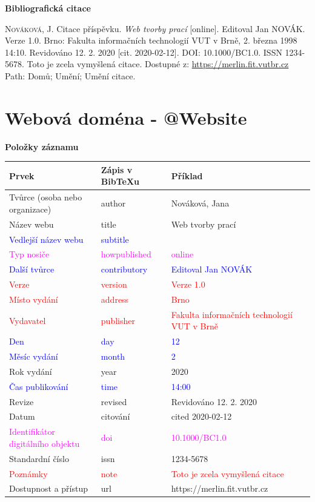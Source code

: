 \bigskip

\noindent \textbf{Bibliografická citace}

\medskip

\noindent \textsc{Nováková}, J. Citace příspěvku. \textit{Web tvorby prací} [online]. Editoval Jan NOVÁK. Verze 1.0. Brno: Fakulta informačních technologií VUT v Brně, 2. března 1998 14:10. Revidováno 12. 2. 2020 [cit. 2020-02-12]. DOI: 10.1000/BC1.0. ISSN 1234-5678. Toto je zcela vymyšlená citace. Dostupné z: \url{https://merlin.fit.vutbr.cz} Path: Domů; Umění; Umění citace.
\newpage
\section*{Webová doména - @Website}
\label{pr-website}
\noindent \textbf{Položky záznamu}

\medskip

\begin{tabularx}{\linewidth}{X X X}
    Prvek & Zápis v BibTeXu & Příklad\\\hline
    Tvůrce (osoba nebo organizace) & author & Nováková, Jana\\
    Název webu & title & Web tvorby prací\\
    \textcolor{blue}{Vedlejší název webu} &  \textcolor{blue}{subtitle} & \\
    \textcolor{magenta}{Typ nosiče} & \textcolor{magenta}{howpublished} & \textcolor{magenta}{online}\\
    \textcolor{blue}{Další tvůrce} & \textcolor{blue}{contributory} & \textcolor{blue}{Editoval Jan NOVÁK}\\
    \textcolor{red}{Verze} & \textcolor{red}{version} & \textcolor{red}{Verze 1.0}\\
    \textcolor{red}{Místo vydání} & \textcolor{red}{address} & \textcolor{red}{Brno}\\
    \textcolor{red}{Vydavatel} & \textcolor{red}{publisher} & \textcolor{red}{Fakulta informačních technologií VUT v Brně}\\
    \textcolor{blue}{Den} & \textcolor{blue}{day} & \textcolor{blue}{12}\\
    \textcolor{blue}{Měsíc vydání} & \textcolor{blue}{month} & \textcolor{blue}{2}\\
    Rok vydání & year & 2020\\
    \textcolor{blue}{Čas publikování} & \textcolor{blue}{time} & \textcolor{blue}{14:00}\\
    Revize & revised & Revidováno 12. 2. 2020\\
    Datum & citování & cited 2020-02-12\\
    \textcolor{magenta}{Identifikátor digitálního objektu} & \textcolor{magenta}{doi} & \textcolor{magenta}{10.1000/BC1.0}\\
    Standardní číslo & issn & 1234-5678\\
    \textcolor{red}{Poznámky} & \textcolor{red}{note} & \textcolor{red}{Toto je zcela vymyšlená citace}\\
    Dostupnost a přístup & url & https://merlin.fit.vutbr.cz
\end{tabularx}

